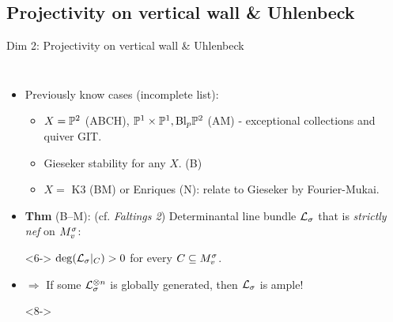 \documentclass[8pt,handout]{beamer} %
\begin{document}
\subsection{{\color{purple} Projectivity on vertical wall \& Uhlenbeck}}
\begin{frame}[fragile]{Dim 2: Projectivity on vertical wall \& Uhlenbeck}
    \begin{columns}[t]
        \begin{itemize}
            \item<2-> Previously know cases (incomplete list):
            \begin{itemize}
                \item<3-> $X = \mathbb{P}^2$ {\footnotesize (ABCH)}, $\mathbb{P}^1 \times \mathbb{P}^1, \text{Bl}_p \mathbb{P}^2$ {\footnotesize (AM)} - exceptional collections and quiver GIT.
                \item<4-> Gieseker stability for any $X$. {\footnotesize (B)}
                \item<5-> $X = $ K3 {\footnotesize (BM)} or Enriques {\footnotesize (N)}: relate to Gieseker by Fourier-Mukai.
            \end{itemize}
        \item<6-> \textbf{Thm} (B--M): (cf. \textit{Faltings 2}) Determinantal line bundle $\mathcal{L}_\sigma$ that is \textit{strictly nef} on $M^\sigma_v$: %
        \item[]<6-> $\deg(\mathcal{L}_\sigma|_C) > 0$ for every $C \subseteq M^\sigma_v$.
        \item<7-> $\Rightarrow$ If some $\mathcal{L}_\sigma^{\otimes n}$ is globally generated, then $\mathcal{L}_\sigma$ is ample!
        \item[]
        \item[]<8->
        \begin{center}
\end{center}
\end{itemize}
\end{columns}
\end{frame}
\end{document}
